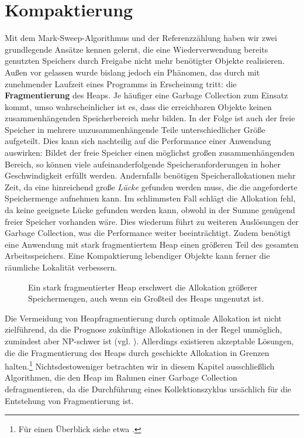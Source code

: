 \chapter{Kompaktierung}
\label{cha:compacting}
Mit dem Mark-Sweep-Algorithmus und der Referenzzählung haben wir zwei grundlegende Ansätze kennen gelernt, die eine Wiederverwendung bereits genutzten Speichers durch Freigabe nicht mehr benötigter Objekte realisieren.
Außen vor gelassen wurde bislang jedoch ein Phänomen, das durch mit zunehmender Laufzeit eines Programms in Erscheinung tritt:
die \textbf{Fragmentierung} des Heaps.
Je häufiger eine Garbage Collection zum Einsatz kommt, umso wahrscheinlicher ist es, dass die erreichbaren Objekte keinen zusammenhängenden Speicherbereich mehr bilden.
In der Folge ist auch der freie Speicher in mehrere unzusammenhängende Teile unterschiedlicher Größe aufgeteilt.
Dies kann sich nachteilig auf die Performance einer Anwendung auswirken:
Bildet der freie Speicher einen möglichst großen zusammenhängenden Bereich, so können viele aufeinanderfolgende Speicheranforderungen in hoher Geschwindigkeit erfüllt werden.
Andernfalls benötigen Speicherallokationen mehr Zeit, da eine hinreichend große \textit{Lücke} gefunden werden muss, die die angeforderte Speichermenge aufnehmen kann.
Im schlimmsten Fall schlägt die Allokation fehl, da keine geeignete Lücke gefunden werden kann, obwohl in der Summe genügend freier Speicher vorhanden wäre.
Dies wiederum führt zu weiteren Auslösungen der Garbage Collection, was die Performance weiter beeinträchtigt.
Zudem benötigt eine Anwendung mit stark fragmentiertem Heap einen größeren Teil des gesamten Arbeitsspeichers.
Eine Kompaktierung lebendiger Objekte kann ferner die räumliche Lokalität verbessern.

\begin{figure}[h]
	\centering
	
	\caption[Fragmentierter Heap]{Ein stark fragmentierter Heap erschwert die Allokation größerer Speichermengen, auch wenn ein Großteil des Heaps ungenutzt ist.}
	\label{fig:fragmentation}
\end{figure}

Die Vermeidung von Heapfragmentierung durch optimale Allokation ist nicht zielführend, da die Prognose zukünftige Allokationen in der Regel unmöglich, zumindest aber NP-schwer ist (vgl. \cite{robson1980}).
Allerdings existieren akzeptable Lösungen, die die Fragmentierung des Heaps durch geschickte Allokation in Grenzen halten.\footnote{Für einen Überblick siehe etwa \cite[Kap. 7]{handbook}.}
Nichtsdestoweniger betrachten wir in diesem Kapitel ausschließlich Algorithmen, die den Heap im Rahmen einer Garbage Collection defragmentieren, da die Durchführung eines Kollektionszyklus ursächlich für die Entstehung von Fragmentierung ist.

